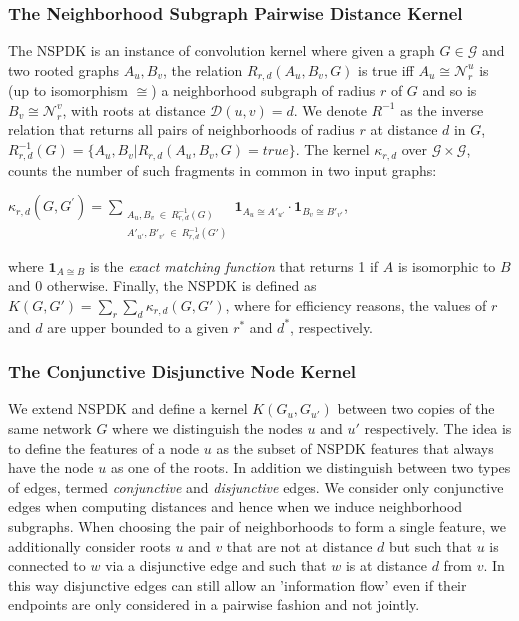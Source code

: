 \documentclass{esannV2}
\begin{document}
\subsubsection{The Neighborhood Subgraph Pairwise Distance Kernel}
The NSPDK is an instance of convolution kernel \cite{covolution_kernel} where given a graph $G \in \mathcal{G}$ and two rooted graphs $A_u, B_v$, the relation $R_{r,d}(A_u, B_v, G)$ is true iff $A_u \cong \mathcal{N}_r^u$ is (up to isomorphism $\cong$) a neighborhood subgraph of radius $r$ of $G$ and so is $B_v \cong  \mathcal{N}_r^v$, with roots at distance $\mathcal{D}(u,v)= d$. We denote $R^{-1}$ as the inverse relation that returns all pairs of neighborhoods of radius $r$ at distance $d$ in $G$, $R^{-1}_{r,d}(G) = \lbrace A_u, B_v | R_{r,d}(A_u,B_v,G)=true\rbrace$. The kernel $\kappa_{r,d}$ over $\mathcal{G} \times \mathcal{G}$, counts the number of such fragments in common in two input graphs: 
\begin{center}
$\kappa_{r,d}(G,G^{'}) = 
\!\!\!\!\!\!\!\!\!\!\!\! 
\sum\limits_{\substack{A_u, B_v \ \in \ R_{r,d}^{-1}(G) \\ 
{A'}_{u'}, {B'}_{v'} \ \in \ R_{r,d}^{-1}(G')
}} \!\!\!\!\!\!\!\!\!\!\!\!  { { \textbf{1}_{A_{u} \cong A'_{u'}}} \cdot {
\textbf{1}_{B_{v} \cong B'_{v'}}} }$, 
\end{center} 
\noindent where $\textbf{1}_{A \cong B}$ is the \textit{exact matching function} that returns 1 if $A$ is
isomorphic to $B$ and 0 otherwise.  Finally, the NSPDK is defined as $K(G,G') = \sum\limits_{r}{\sum\limits_{d}{\kappa_{r,d}(G,G')}}$, where for efficiency reasons, the values of $r$ and $d$ are upper bounded to a given $r^*$ and $d^*$, respectively.
\subsubsection{The Conjunctive Disjunctive Node Kernel}
We extend NSPDK and define a kernel $K(G_u,G_{u'})$ between two copies of the same network $G$ where we distinguish the nodes $u$ and $u'$ respectively. The idea is to define the features of a node $u$ as the subset of NSPDK features that always have the node $u$ as one of the roots. In addition we distinguish between two types of edges, termed {\em conjunctive} and {\em disjunctive} edges. We consider only conjunctive edges when computing distances and hence when we induce neighborhood subgraphs. When choosing the
pair of neighborhoods to form a single feature, we additionally consider roots $u$ and $v$ that are not at distance $d$ but such that $u$ is connected to $w$ via a disjunctive edge and such that $w$ is at distance $d$ from $v$. In this way disjunctive edges can still allow an 'information flow' even if their
endpoints are only considered in a pairwise fashion and not jointly. 
\end{document}
